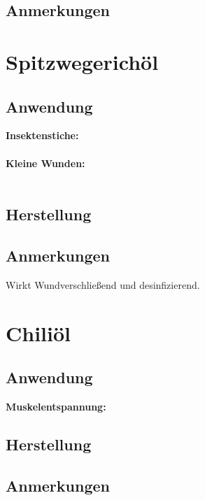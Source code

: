 \subsection{Anmerkungen}





\section{Spitzwegerichöl}

\subsection{Anwendung}

\textbf{Insektenstiche:} \\ \\
\textbf{Kleine Wunden:} \\ \\


\cite{swrhandwerkskunst}

\subsection{Herstellung}

\cite{swrhandwerkskunst}

\subsection{Anmerkungen}

Wirkt Wundverschließend und desinfizierend.



\section{Chiliöl}

\subsection{Anwendung}

\textbf{Muskelentspannung:}

\subsection{Herstellung}

\subsection{Anmerkungen}





